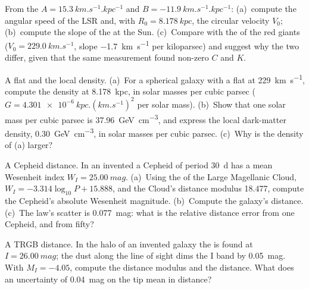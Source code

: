 \begin{exercise}[$\star\star$]\label{exo:b3:milky-way-galaxies:5}
From the  $A = \qty{15.3}{km.s^{-1}.kpc^{-1}}$ and
$B = \qty{-11.9}{km.s^{-1}.kpc^{-1}}$: (a)~compute the angular speed of
the LSR and, with $R_0 = \qty{8.178}{kpc}$, the circular velocity $V_0$;
(b)~compute the slope of the  at the Sun. (c)~Compare
with the  of the red giants ($V_0 = \qty{229.0}{km.s^{-1}}$,
slope \qty{-1.7}{km.s^{-1}} per kiloparsec) and suggest why the two
differ, given that the same measurement found non-zero $C$ and $K$.
\end{exercise}

\begin{exercise}[$\star\star$]\label{exo:b3:milky-way-galaxies:6}
A flat  and the local density. (a)~For a spherical galaxy
with a flat  at \qty{229}{km.s^{-1}}, compute the density at
\qty{8.178}{kpc}, in solar masses per cubic parsec
($G = \qty{4.301e-6}{kpc.(km.s^{-1})^2}$ per solar mass). (b)~Show that
one solar mass per cubic parsec is \qty{37.96}{GeV.cm^{-3}}, and express
the local dark-matter density, \qty{0.30}{GeV.cm^{-3}}, in solar masses
per cubic parsec. (c)~Why is the density of (a) larger?
\end{exercise}

\begin{exercise}[$\star\star$]\label{exo:b3:milky-way-galaxies:7}
A Cepheid distance. In an invented  a Cepheid of period
\qty{30}{d} has a mean Wesenheit index $W_I = \qty{25.00}{mag}$.
(a)~Using the  of the Large Magellanic Cloud,
$W_I = -3.314\log_{10}P + 15.888$, and the Cloud's distance modulus
18.477, compute the Cepheid's absolute Wesenheit magnitude. (b)~Compute
the galaxy's distance. (c)~The law's scatter is \qty{0.077}{mag}: what is
the relative distance error from one Cepheid, and from fifty?
\end{exercise}

\begin{exercise}[$\star\star$]\label{exo:b3:milky-way-galaxies:8}
A TRGB distance. In the halo of an invented galaxy the  is found at $I = \qty{26.00}{mag}$; the dust along the line of
sight dims the I band by \qty{0.05}{mag}. With $M_I = -4.05$, compute the
distance modulus and the distance. What does an uncertainty of
\qty{0.04}{mag} on the tip mean in distance?
\end{exercise}

